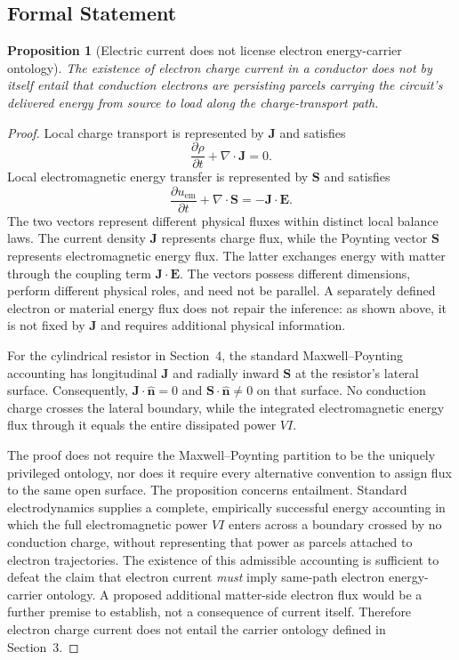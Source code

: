 \documentclass[12pt,onecolumn]{article}
\newcounter{nogo}[section]
\newtheorem{proposition}{Proposition}
\begin{document}
\subsection{Formal Statement}

\begin{proposition}[Electric current does not license electron energy-carrier ontology]
\label{prop:nogo}
The existence of electron charge current in a conductor does not by itself entail that conduction electrons are persisting parcels carrying the circuit's delivered energy from source to load along the charge-transport path.
\end{proposition}

\begin{proof}
Local charge transport is represented by $\mathbf J$ and satisfies
\[
\frac{\partial\rho}{\partial t}+\nabla\cdot\mathbf J=0.
\]
Local electromagnetic energy transfer is represented by $\mathbf S$ and satisfies
\[
\frac{\partial u_{\mathrm{em}}}{\partial t}
+\nabla\cdot\mathbf S
=-\mathbf J\cdot\mathbf E.
\]
The two vectors represent different physical fluxes within distinct local balance laws. The current density $\mathbf J$ represents charge flux, while the Poynting vector $\mathbf S$ represents electromagnetic energy flux. The latter exchanges energy with matter through the coupling term $\mathbf J\cdot\mathbf E$. The vectors possess different dimensions, perform different physical roles, and need not be parallel. A separately defined electron or material energy flux does not repair the inference: as shown above, it is not fixed by $\mathbf J$ and requires additional physical information.

For the cylindrical resistor in Section~4, the standard Maxwell--Poynting accounting has longitudinal $\mathbf J$ and radially inward $\mathbf S$ at the resistor's lateral surface. Consequently, $\mathbf J\cdot\hat{\mathbf n}=0$ and $\mathbf S\cdot\hat{\mathbf n}\neq0$ on that surface. No conduction charge crosses the lateral boundary, while the integrated electromagnetic energy flux through it equals the entire dissipated power $VI$.

The proof does not require the Maxwell--Poynting partition to be the uniquely privileged ontology, nor does it require every alternative convention to assign flux to the same open surface. The proposition concerns entailment. Standard electrodynamics supplies a complete, empirically successful energy accounting in which the full electromagnetic power $VI$ enters across a boundary crossed by no conduction charge, without representing that power as parcels attached to electron trajectories. The existence of this admissible accounting is sufficient to defeat the claim that electron current \emph{must} imply same-path electron energy-carrier ontology. A proposed additional matter-side electron flux would be a further premise to establish, not a consequence of current itself. Therefore electron charge current does not entail the carrier ontology defined in Section~3.
\end{proof}
\end{document}
